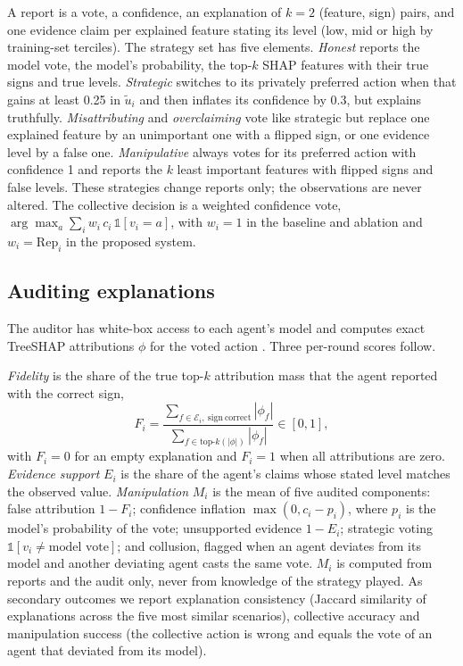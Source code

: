 \documentclass[pdflatex,sn-basic]{sn-jnl}
\begin{document}
A report is a vote, a confidence, an explanation of $k=2$ (feature, sign) pairs, and one
evidence claim per explained feature stating its level (low, mid or high by training-set
terciles). The strategy set has five elements. \emph{Honest} reports the model vote, the
model's probability, the top-$k$ SHAP features with their true signs and true levels.
\emph{Strategic} switches to its privately preferred action when that gains at least 0.25 in
$\tilde u_i$ and then inflates its confidence by 0.3, but explains truthfully.
\emph{Misattributing} and \emph{overclaiming} vote like strategic but replace one explained
feature by an unimportant one with a flipped sign, or one evidence level by a false one.
\emph{Manipulative} always votes for its preferred action with confidence 1 and reports the
$k$ least important features with flipped signs and false levels. These strategies change
reports only; the observations are never altered. The collective decision is a weighted
confidence vote, $\arg\max_a \sum_i w_i\, c_i\, \mathbb{1}[v_i=a]$, with $w_i=1$ in the
baseline and ablation and $w_i=\mathrm{Rep}_i$ in the proposed system.

\subsection{Auditing explanations}\label{sec:metrics}

The auditor has white-box access to each agent's model and computes exact TreeSHAP
attributions $\phi$ for the voted action \citep{lundberg2020}. Three per-round scores follow.

\emph{Fidelity} is the share of the true top-$k$ attribution mass that the agent reported with
the correct sign,
\begin{equation}
F_i=\frac{\sum_{f\in \mathcal{E}_i,\ \mathrm{sign}\ \mathrm{correct}}|\phi_f|}
{\sum_{f\in \mathrm{top}\text{-}k(|\phi|)}|\phi_f|}\in[0,1],
\end{equation}
with $F_i=0$ for an empty explanation and $F_i=1$ when all attributions are zero.
\emph{Evidence support} $E_i$ is the share of the agent's claims whose stated level matches
the observed value. \emph{Manipulation} $M_i$ is the mean of five audited components: false
attribution $1-F_i$; confidence inflation $\max(0, c_i-p_i)$, where $p_i$ is the model's
probability of the vote; unsupported evidence $1-E_i$; strategic voting
$\mathbb{1}[v_i\neq \text{model vote}]$; and collusion, flagged when an agent deviates from
its model and another deviating agent casts the same vote. $M_i$ is computed from reports and
the audit only, never from knowledge of the strategy played. As secondary outcomes we report
explanation consistency (Jaccard similarity of explanations across the five most similar
scenarios), collective accuracy and manipulation success (the collective action is wrong and
equals the vote of an agent that deviated from its model).
\end{document}
